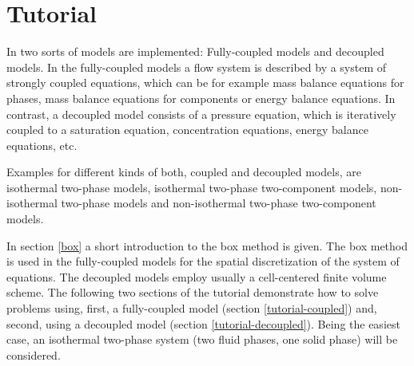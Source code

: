\chapter[Tutorial]{Tutorial}\label{chp:tutorial}

In \Dumux two sorts of models are implemented: Fully-coupled models and decoupled models. In the fully-coupled models a flow system is described by a system of strongly coupled equations, which can be for example mass balance equations for phases, mass balance equations for components or energy balance equations. In contrast, a decoupled model consists of a pressure equation, which is iteratively coupled to a saturation equation, concentration equations, energy balance equations, etc.

Examples for different kinds of both, coupled and decoupled models, are isothermal two-phase models, isothermal two-phase two-component models, non-isothermal two-phase models and non-isothermal two-phase two-component models.

In section \ref{box} a short introduction to the box method is given. The box method is used in the fully-coupled models for the spatial discretization of the system of equations. The decoupled models employ usually a cell-centered finite volume scheme. The following two sections of the tutorial demonstrate how to solve problems using, first, a fully-coupled model (section \ref{tutorial-coupled}) and, second, using a decoupled model (section \ref{tutorial-decoupled}). Being the easiest case, an isothermal two-phase system (two fluid phases, one solid phase) will be considered.


%

